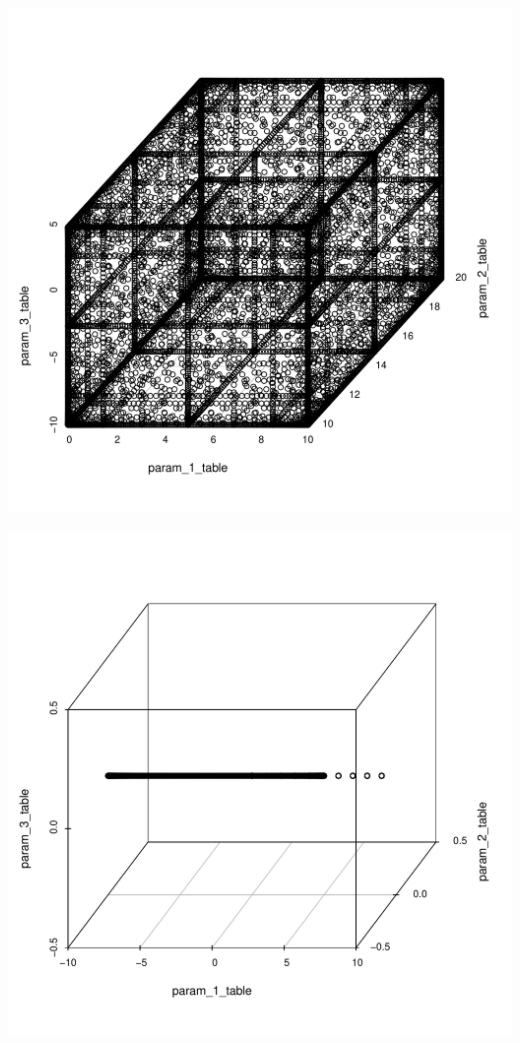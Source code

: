 \documentclass[times,12pt,3p]{article}\usepackage[]{graphicx}\usepackage[]{color}
\makeatletter
\def\maxwidth{ %
  \ifdim\Gin@nat@width>\linewidth
    \linewidth
  \else
    \Gin@nat@width
  \fi
}
\newenvironment{knitrout}{}{} %
\makeatother
\begin{document}
\begin{knitrout}
\color{fgcolor}
\includegraphics[width=\maxwidth]{figure/unnamed-chunk-2-1} 

\includegraphics[width=\maxwidth]{figure/unnamed-chunk-2-2} 

\end{knitrout}
\end{document}
